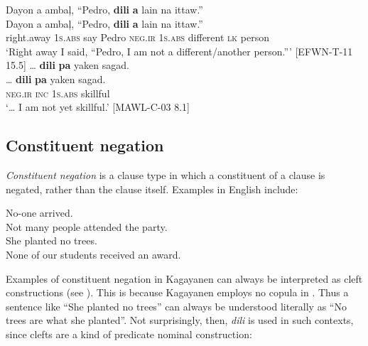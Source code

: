 \ea
\label{bkm:Ref446051860}
Dayon  a  ambaļ,  “Pedro,  \textbf{dili}  \textbf{a}  lain  na  ittaw.” \\\smallskip
\gll Dayon  a  ambaļ,  “Pedro,  \textbf{dili}  \textbf{a}  lain  na  ittaw.” \\
right.away  1\textsc{s.abs}  say  Pedro  \textsc{neg.ir}  1\textsc{s.abs}  different  \textsc{lk}  person \\
\glt ‘Right away I said, “Pedro, I am not a different/another person.”' [EFWN-T-11 15.5]
\z
\ea
\label{bkm:Ref373229895}
… \textbf{dili}  \textbf{pa}  yaken  sagad. \\\smallskip
\gll … \textbf{dili}  \textbf{pa}  yaken  sagad. \\
{} \textsc{neg.ir}  \textsc{inc}  1\textsc{s.abs}  skillful \\
\glt ‘… I am not yet skillful.’ [MAWL-C-03 8.1]
\z
\subsection{Constituent negation}
\label{sec:constituentnegation} 
\textit{Constituent negation} is a clause type in which a constituent of a clause is negated, rather than the clause itself. Examples in English include:

\ea
No-one arrived. \\
Not many people attended the party. \\
She planted no trees. \\
None of our students received an award.
\z

Examples of constituent negation in Kagayanen can always be interpreted as cleft constructions (see  ). This is because Kagayanen employs no copula in . Thus a sentence like “She planted no trees” can always be understood literally as “No trees are what she planted”. Not surprisingly, then, \textit{dili} is used in such contexts, since clefts are a kind of predicate nominal construction:


